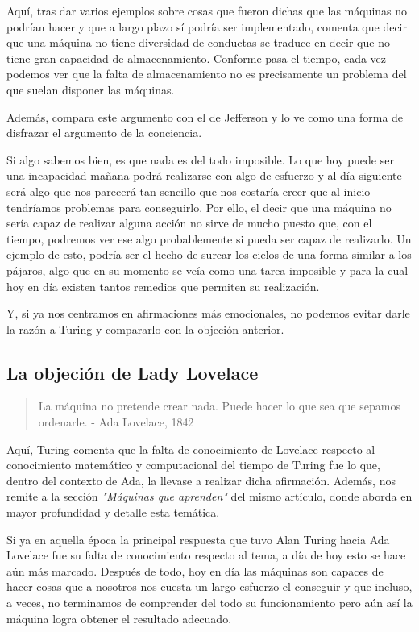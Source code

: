 \documentclass[12pt,a4paper]{article}
\begin{document}
Aquí, tras dar varios ejemplos sobre cosas que fueron dichas que las máquinas no podrían hacer y que a largo plazo sí podría ser implementado, comenta que decir que una máquina no tiene diversidad de conductas se traduce en decir que no tiene gran capacidad de almacenamiento. Conforme pasa el tiempo, cada vez podemos ver que la falta de almacenamiento no es precisamente un problema del que suelan disponer las máquinas.

Además, compara este argumento con el de Jefferson y lo ve como una forma de disfrazar el argumento de la conciencia.

Si algo sabemos bien, es que nada es del todo imposible. Lo que hoy puede ser una incapacidad mañana podrá realizarse con algo de esfuerzo y al día siguiente será algo que nos parecerá tan sencillo que nos costaría creer que al inicio tendríamos problemas para conseguirlo. Por ello, el decir que una máquina no sería capaz de realizar alguna acción no sirve de mucho puesto que, con el tiempo, podremos ver ese algo probablemente si pueda ser capaz de realizarlo. Un ejemplo de esto, podría ser el hecho de surcar los cielos de una forma similar a los pájaros, algo que en su momento se veía como una tarea imposible y para la cual hoy en día existen tantos remedios que permiten su realización.

Y, si ya nos centramos en afirmaciones más emocionales, no podemos evitar darle la razón a Turing y compararlo con la objeción anterior.

\subsection{La objeción de Lady Lovelace}
\begin{quote}\small La máquina no pretende crear nada. Puede hacer lo que sea que sepamos ordenarle. - Ada Lovelace, 1842\end{quote}

Aquí, Turing comenta que la falta de conocimiento de Lovelace respecto al conocimiento matemático y computacional del tiempo de Turing fue lo que, dentro del contexto de Ada, la llevase a realizar dicha afirmación. Además, nos remite a la sección \emph{"Máquinas que aprenden"} del mismo artículo, donde aborda en mayor profundidad y detalle esta temática.

Si ya en aquella época la principal respuesta que tuvo Alan Turing hacia Ada Lovelace fue su falta de conocimiento respecto al tema, a día de hoy esto se hace aún más marcado. Después de todo, hoy en día las máquinas son capaces de hacer cosas que a nosotros nos cuesta un largo esfuerzo el conseguir y que incluso, a veces, no terminamos de comprender del todo su funcionamiento pero aún así la máquina logra obtener el resultado adecuado.
\end{document}
